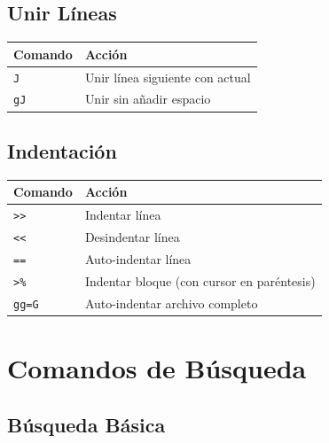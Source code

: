 \documentclass[
  doc,
  floatsintext,
  longtable,
  a4paper,
  nolmodern,
  notxfonts,
  notimes,
  12pt,
  colorlinks=true,linkcolor=blue,citecolor=blue,urlcolor=blue]{apa7}
\newcounter{none} %
\begin{document}
\subsection{Unir Líneas}\label{unir-luxedneas}

{\def\LTcaptype{none} %
\begin{longtable}[]{@{}ll@{}}
\toprule\noalign{}
Comando & Acción \\
\midrule\noalign{}
\endhead
\bottomrule\noalign{}
\endlastfoot
\texttt{J} & Unir línea siguiente con actual \\
\texttt{gJ} & Unir sin añadir espacio \\
\end{longtable}
}

\subsection{Indentación}\label{indentaciuxf3n}

{\def\LTcaptype{none} %
\begin{longtable}[]{@{}ll@{}}
\toprule\noalign{}
Comando & Acción \\
\midrule\noalign{}
\endhead
\bottomrule\noalign{}
\endlastfoot
\texttt{\textgreater{}\textgreater{}} & Indentar línea \\
\texttt{\textless{}\textless{}} & Desindentar línea \\
\texttt{==} & Auto-indentar línea \\
\texttt{\textgreater{}\%} & Indentar bloque (con cursor en
paréntesis) \\
\texttt{gg=G} & Auto-indentar archivo completo \\
\end{longtable}
}

\section{Comandos de Búsqueda}\label{comandos-de-buxfasqueda}

\subsection{Búsqueda Básica}\label{buxfasqueda-buxe1sica}
\end{document}
